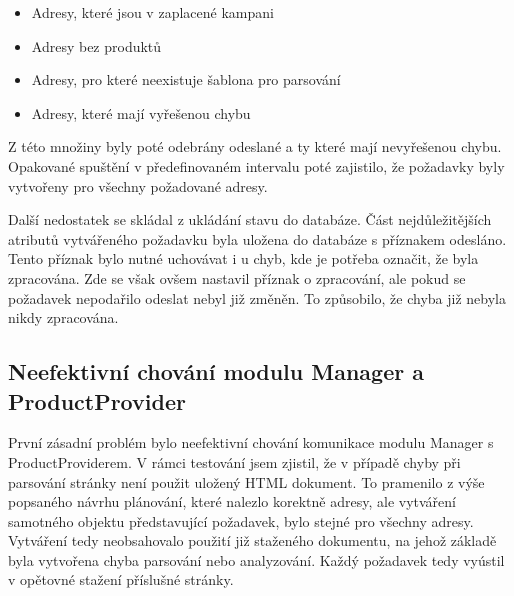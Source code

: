 \documentclass[thesis=B,czech]{FITthesis}[2012/06/26]
\begin{document}
\begin{itemize}
\item Adresy, které jsou v zaplacené kampani
\item Adresy bez produktů
\item Adresy, pro které neexistuje šablona pro parsování
\item Adresy, které mají vyřešenou chybu
\end{itemize}

Z této množiny byly poté odebrány odeslané a ty které mají nevyřešenou chybu. Opakované spuštění v předefinovaném intervalu poté 
zajistilo, že požadavky byly vytvořeny pro všechny požadované adresy.
\par
Další nedostatek se skládal z ukládání stavu do databáze. Část nejdůležitějších atributů vytvářeného požadavku byla uložena do databáze 
s příznakem odesláno. Tento příznak bylo nutné uchovávat i u chyb, kde je potřeba označit, že byla zpracována. Zde se však 
ovšem nastavil příznak o zpracování, ale pokud se požadavek nepodařilo odeslat nebyl již změněn. To způsobilo, že chyba již 
nebyla nikdy zpracována.

\subsection{Neefektivní chování modulu Manager a ProductProvider}
První zásadní problém bylo neefektivní chování komunikace modulu Manager s ProductProviderem. V rámci testování jsem zjistil, že v 
případě chyby při parsování stránky není použit uložený HTML dokument.
To pramenilo z výše popsaného návrhu plánování, které nalezlo korektně adresy, ale vytváření samotného objektu představující požadavek,
bylo stejné pro všechny adresy. Vytváření tedy neobsahovalo použití již staženého dokumentu, na jehož základě byla vytvořena 
chyba parsování nebo analyzování. Každý požadavek tedy vyústil v opětovné stažení příslušné stránky.
\end{document}
